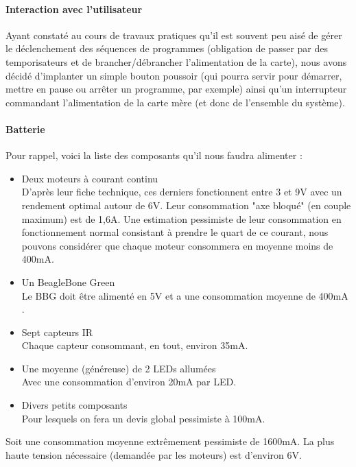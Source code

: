 		\paragraph{Interaction avec l'utilisateur}

			Ayant constaté au cours de travaux pratiques qu'il est souvent peu aisé de gérer le déclenchement des séquences de programmes (obligation de passer par des temporisateurs et de brancher/débrancher l'alimentation de la carte), nous avons décidé d'implanter un simple bouton poussoir (qui pourra servir pour démarrer, mettre en pause ou arrêter un programme, par exemple) ainsi qu'un interrupteur commandant l'alimentation de la carte mère (et donc de l'ensemble du système).

		\paragraph{Batterie}

			Pour rappel, voici la liste des composants qu'il nous faudra alimenter :
			\begin{itemize}
				\item Deux moteurs à courant continu\\
				D'après leur fiche technique\cite{bib8}, ces derniers fonctionnent entre 3 et 9V avec un rendement optimal autour de 6V. Leur consommation "axe bloqué" (en couple maximum) est de 1,6A. Une estimation pessimiste de leur consommation en fonctionnement normal consistant à prendre le quart de ce courant, nous pouvons considérer que chaque moteur consommera en moyenne moins de 400mA.
				\item Un BeagleBone Green\\
				Le BBG doit être alimenté en 5V et a une consommation moyenne de 400mA \cite{bib13}.
				\item Sept capteurs IR\\
				Chaque capteur consommant, en tout, environ 35mA.
				\item Une moyenne (généreuse) de 2 LEDs allumées\\
				Avec une consommation d'environ 20mA par LED.
				\item Divers petits composants\\
				Pour lesquels on fera un devis global pessimiste à 100mA.
			\end{itemize}

			Soit une consommation moyenne extrêmement pessimiste de 1600mA.
			La plus haute tension nécessaire (demandée par les moteurs) est d'environ 6V.\\

